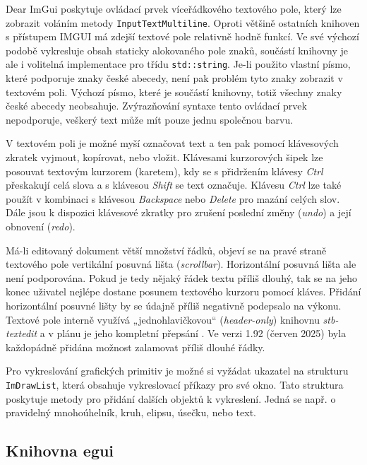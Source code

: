 \documentclass[FM,DP]{tulthesis}
\begin{document}
	Dear ImGui poskytuje ovládací prvek víceřádkového textového pole, který lze zobrazit voláním metody \texttt{InputTextMultiline}. Oproti většině ostatních knihoven s přístupem IMGUI má zdejší textové pole relativně hodně funkcí. Ve své výchozí podobě vykresluje obsah staticky alokovaného pole znaků, součástí knihovny je ale i volitelná implementace pro třídu \texttt{std::string}. Je-li použito vlastní písmo, které podporuje znaky české abecedy, není pak problém tyto znaky zobrazit v textovém poli. Výchozí písmo, které je součástí knihovny, totiž všechny znaky české abecedy neobsahuje. Zvýrazňování syntaxe tento ovládací prvek nepodporuje, veškerý text může mít pouze jednu společnou barvu.
	
	V textovém poli je možné myší označovat text a ten pak pomocí klávesových zkratek vyjmout, kopírovat, nebo vložit. Klávesami kurzorových šipek lze posouvat textovým kurzorem (karetem), kdy se s přidržením klávesy \textit{Ctrl} přeskakují celá slova a s klávesou \textit{Shift} se text označuje. Klávesu \textit{Ctrl} lze také použít v kombinaci s klávesou \textit{Backspace} nebo \textit{Delete} pro mazání celých slov. Dále jsou k dispozici klávesové zkratky pro zrušení poslední změny (\textit{undo}) a její obnovení (\textit{redo}).
	
	Má-li editovaný dokument větší množství řádků, objeví se na pravé straně textového pole vertikální posuvná lišta (\textit{scrollbar}). Horizontální posuvná lišta ale není podporována. Pokud je tedy nějaký řádek textu příliš dlouhý, tak se na jeho konec uživatel nejlépe dostane posunem textového kurzoru pomocí kláves. Přidání horizontální posuvné lišty by se údajně příliš negativně podepsalo na výkonu. Textové pole interně využívá „jednohlavičkovou“ (\textit{header-only}) knihovnu \textit{stb-textedit} a v plánu je jeho kompletní přepsání \cite{online_imgui10yrs}. Ve verzi 1.92 (červen 2025) byla každopádně přidána možnost zalamovat příliš dlouhé řádky.

	Pro vykreslování grafických primitiv je možné si vyžádat ukazatel na strukturu \texttt{ImDrawList}, která obsahuje vykreslovací příkazy pro své okno. Tato struktura poskytuje metody pro přidání dalších objektů k vykreslení. Jedná se např. o pravidelný mnohoúhelník, kruh, elipsu, úsečku, nebo text. %
		
	\subsection{Knihovna egui}
	
\end{document}
